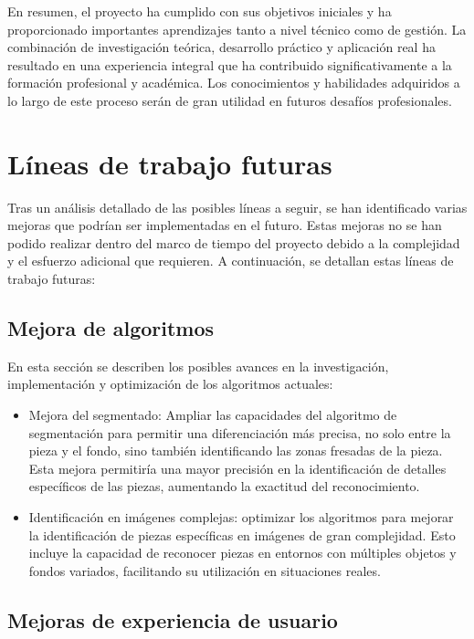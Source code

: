 En resumen, el proyecto ha cumplido con sus objetivos iniciales y ha proporcionado importantes aprendizajes tanto a nivel técnico como de gestión. La combinación de investigación teórica, desarrollo práctico y aplicación real ha resultado en una experiencia integral que ha contribuido significativamente a la formación profesional y académica. Los conocimientos y habilidades adquiridos a lo largo de este proceso serán de gran utilidad en futuros desafíos profesionales.

\section{Líneas de trabajo futuras}\label{líneas-de-trabajo-futuras}

Tras un análisis detallado de las posibles líneas a seguir, se han identificado varias mejoras que podrían ser implementadas en el futuro. Estas mejoras no se han podido realizar dentro del marco de tiempo del proyecto debido a la complejidad y el esfuerzo adicional que requieren. A continuación, se detallan estas líneas de trabajo futuras:

\subsection{Mejora de algoritmos}\label{mejora-de-algoritmos}

En esta sección se describen los posibles avances en la investigación, implementación y optimización de los algoritmos actuales:

\begin{itemize}
    \item Mejora del segmentado: Ampliar las capacidades del algoritmo de segmentación para permitir una diferenciación más precisa, no solo entre la pieza y el fondo, sino también identificando las zonas fresadas de la pieza. Esta mejora permitiría una mayor precisión en la identificación de detalles específicos de las piezas, aumentando la exactitud del reconocimiento.
    \item Identificación en imágenes complejas: optimizar los algoritmos para mejorar la identificación de piezas específicas en imágenes de gran complejidad. Esto incluye la capacidad de reconocer piezas en entornos con múltiples objetos y fondos variados, facilitando su utilización en situaciones reales.
\end{itemize}

\subsection{Mejoras de experiencia de usuario}\label{mejoras-de-experiencia-de-usuario}

